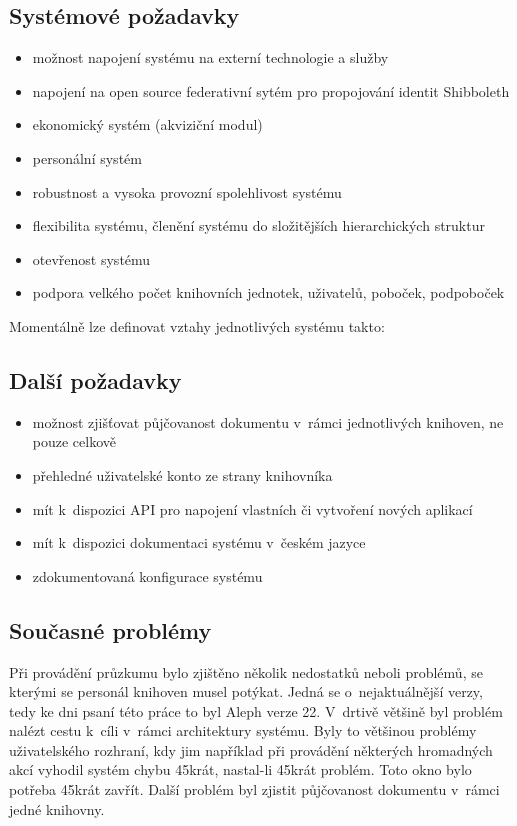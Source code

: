 \documentclass[
	11pt, oneside, printed, draft, 
	table,   %
	lof,     %
	lot     %
]{fithesis3}
\newcommand{\mezera}{\bigskip}
\begin{document}
{\subsection{Systémové požadavky}

\begin{itemize}
\item možnost napojení systému na externí technologie a služby
\item napojení na open source federativní sytém pro propojování identit Shibboleth
\item ekonomický systém (akviziční modul)
\item personální systém
\item robustnost a vysoka provozní spolehlivost systému
\item flexibilita systému, členění systému do složitějších hierarchických struktur
\item otevřenost systému
\item podpora velkého počet knihovních jednotek, uživatelů, poboček, podpoboček
\end{itemize}

Momentálně lze definovat vztahy jednotlivých systému takto:
\mezera

\subsection{Další požadavky}

\begin{itemize}
\item možnost zjišťovat půjčovanost dokumentu v~rámci jednotlivých knihoven, ne pouze celkově
\item přehledné uživatelské konto ze strany knihovníka
\item mít k~dispozici API pro napojení vlastních či vytvoření nových aplikací
\item mít k~dispozici dokumentaci systému v~českém jazyce
\item zdokumentovaná konfigurace systému
\end{itemize}


\subsection{Současné problémy}
Při provádění průzkumu bylo zjištěno několik nedostatků neboli problémů, se kterými se personál knihoven musel potýkat. Jedná se o~nejaktuálnější verzy, tedy ke dni psaní této práce to byl Aleph verze 22. V~drtivě většině byl problém nalézt cestu k~cíli v~rámci architektury systému. Byly to většinou problémy uživatelského rozhraní, kdy jim například při provádění některých hromadných akcí vyhodil systém chybu 45krát, nastal-li 45krát problém. Toto okno bylo potřeba 45krát zavřít. Další problém byl zjistit půjčovanost dokumentu v~rámci jedné knihovny.

}
\end{document}
